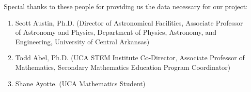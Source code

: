 \noindent Special thanks to these people for providing us the data necessary for our project:

\begin{enumerate}
    \item Scott Austin, Ph.D. (Director of Astronomical Facilities, Associate Professor of Astronomy and Physics, Department of Physics, Astronomy, and Engineering, University of Central Arkansas) 
    \item Todd Abel, Ph.D. (UCA STEM Institute Co-Director, Associate Professor of Mathematics, Secondary Mathematics Education Program Coordinator)
    \item Shane Ayotte. (UCA Mathematics Student)
\end{enumerate}
